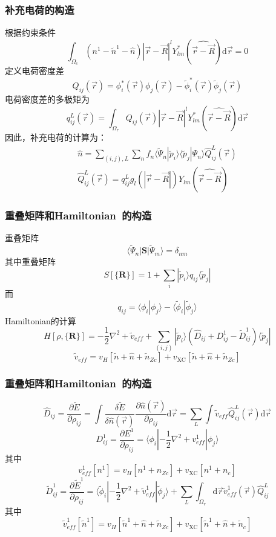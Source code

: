 \documentclass[cjk,slidestop,compress,mathserif,blue]{beamer}
\begin{document}
\frame
{
	\frametitle{补充电荷的构造}
	根据约束条件
	\begin{displaymath}
		\int_{\Omega_c}(n^1-\tilde n^1-\hat n)|\vec r-\vec R|^lY_{lm}^{\ast}(\widehat{\vec r-\vec R})\mathrm{d}\vec r=0
	\end{displaymath}
	定义电荷密度差
	\begin{displaymath}
		Q_{ij}(\vec r)=\phi_i^{\ast}(\vec r)\phi_j(\vec r)-\tilde\phi_i^{\ast}(\vec r)\tilde\phi_j(\vec r)
	\end{displaymath}
	电荷密度差的多极矩为
	\begin{displaymath}
		q_{ij}^L(\vec r)=\int_{\Omega_r}Q_{ij}(\vec r)|\vec r-\vec R|^lY_{lm}^{\ast}(\widehat{\vec r-\vec R})\mathrm{d}\vec r
	\end{displaymath}
	因此，补充电荷的计算为：
	\begin{displaymath}
		\begin{aligned}
			\hat n=\sum_{(i,j),L}\sum_n f_n\langle\tilde\Psi_n|\tilde p_i\rangle\langle\tilde p_j|\Psi_n\rangle\hat Q_{ij}^L(\vec r)\\
			\hat Q_{ij}^L(\vec r)=q_{ij}^Lg_l(|\vec r-\vec R|)Y_{lm}(\widehat{\vec r-\vec R})
		\end{aligned}
	\end{displaymath}
}

\frame
{
	\frametitle{重叠矩阵和\textrm{Hamiltonian~}的构造}
重叠矩阵
	\begin{displaymath}
		\langle\tilde\Psi_n|\mathbf{S}|\tilde\Psi_m\rangle=\delta_{nm}
	\end{displaymath}
	其中重叠矩阵$$S[\{\mathbf{R}\}]=1+\sum_i|\tilde p_i\rangle q_{ij}\langle\tilde p_j|$$
	而$$q_{ij}=\langle\phi_i|\phi_j\rangle-\langle\tilde\phi_i|\tilde\phi_j\rangle$$
	\textrm{Hamiltonian}的计算
	\begin{displaymath}
		H[\rho,\{\mathbf{R}\}]=-\dfrac12\nabla^2+\tilde v_{e\!f\!f}+\sum_{(i,j)}|\tilde p_i\rangle(\hat D_{ij}+D_{ij}^1-\tilde D_{ij}^1)\langle\tilde p_j|	
	\end{displaymath}
	$$\tilde v_{e\!f\!f}=v_H[\tilde n+\hat n+\tilde n_{Zc}]+v_{\mathrm{XC}}[\tilde n+\hat n+\tilde n_{Zc}]$$
}

\frame
{
	\frametitle{重叠矩阵和\textrm{Hamiltonian~}的构造}
	$$\hat D_{ij}=\dfrac{\partial\tilde E}{\partial\rho_{ij}}=\int\dfrac{\delta\tilde E}{\delta\hat n(\vec  r)}\dfrac{\partial\hat n(\vec r)}{\partial\rho_{ij}}\mathrm{d}\vec r=\sum_{L}\int\tilde v_{e\!f\!f}\hat Q_{ij}^L(\vec r)\mathrm{d}\vec r$$
	$$D_{ij}^1=\dfrac{\partial E^1}{\partial\rho_{ij}}=\langle\phi_i|-\dfrac12\nabla^2+v_{e\!f\!f}^1|\phi_j\rangle$$
	其中$$v_{e\!f\!f}^1[n^1]=v_H[n^1+n_{Zc}]+v_{\mathrm{XC}}[n^1+n_c]$$
	$$\tilde D_{ij}^1=\dfrac{\partial\tilde E^1}{\partial\rho_{ij}}=\langle\tilde\phi_i|-\dfrac12\nabla^2+\tilde v_{e\!f\!f}^1|\tilde\phi_j\rangle+\sum_L\int_{\Omega_r}\mathrm{d}\vec r\tilde v_{e\!f\!f}^1(\vec r)\hat Q_{ij}^L$$
	其中$$\tilde v_{e\!f\!f}^1[\tilde n^1]=v_H[\tilde n^1+\hat n+\tilde n_{Zc}]+v_{\mathrm{XC}}[\tilde n^1+\hat n+\tilde n_c]$$
}
\end{document}
